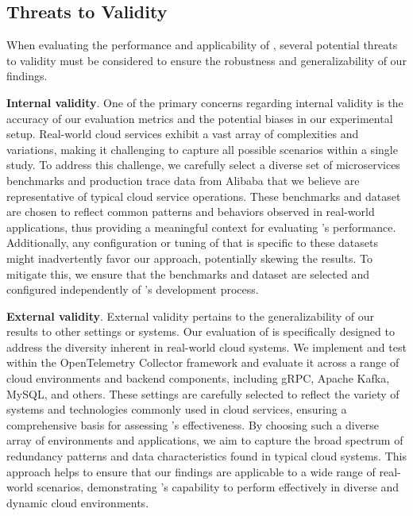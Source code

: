 



\subsection{Threats to Validity}

When evaluating the performance and applicability of \alias, several potential threats to validity must be considered to ensure the robustness and generalizability of our findings.

\textbf{Internal validity}. One of the primary concerns regarding internal validity is the accuracy of our evaluation metrics and the potential biases in our experimental setup.
Real-world cloud services exhibit a vast array of complexities and variations, making it challenging to capture all possible scenarios within a single study.
To address this challenge, we carefully select a diverse set of microservices benchmarks and production trace data from Alibaba that we believe are representative of typical cloud service operations.
These benchmarks and dataset are chosen to reflect common patterns and behaviors observed in real-world applications, thus providing a meaningful context for evaluating \alias's performance.
Additionally, any configuration or tuning of \alias that is specific to these datasets might inadvertently favor our approach, potentially skewing the results.
To mitigate this, we ensure that the benchmarks and dataset are selected and configured independently of \alias's development process.

\textbf{External validity}. External validity pertains to the generalizability of our results to other settings or systems.
Our evaluation of \alias is specifically designed to address the diversity inherent in real-world cloud systems.
We implement and test \alias within the OpenTelemetry Collector framework and evaluate it across a range of cloud environments and backend components, including gRPC, Apache Kafka, MySQL, and others. 
These settings are carefully selected to reflect the variety of systems and technologies commonly used in cloud services, ensuring a comprehensive basis for assessing \alias's effectiveness.
By choosing such a diverse array of environments and applications, we aim to capture the broad spectrum of redundancy patterns and data characteristics found in typical cloud systems.
This approach helps to ensure that our findings are applicable to a wide range of real-world scenarios, demonstrating \alias's capability to perform effectively in diverse and dynamic cloud environments.